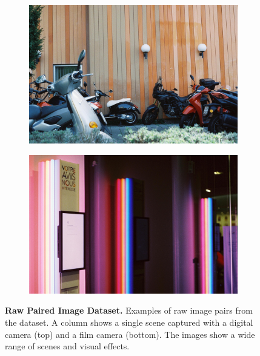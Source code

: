 \begin{figure}
\begin{subfigure}[t]{.19\textwidth}
    \end{subfigure}
    \hfill
    \begin{subfigure}[t]{.19\textwidth}
      \centering
      \includegraphics[width=\linewidth]{figures/film4.jpeg}
    \end{subfigure}
    \begin{subfigure}[t]{.19\textwidth}
      \centering
      \includegraphics[width=\linewidth]{figures/film5.jpeg}
    \end{subfigure}
  
    \caption{\textbf{Raw Paired Image Dataset.} Examples of raw image pairs from the dataset. A column shows a single scene captured with a digital camera (top) and a film camera (bottom). The images show a wide range of scenes and visual effects.}
    \label{fig:raw-dataset}
\end{figure}



